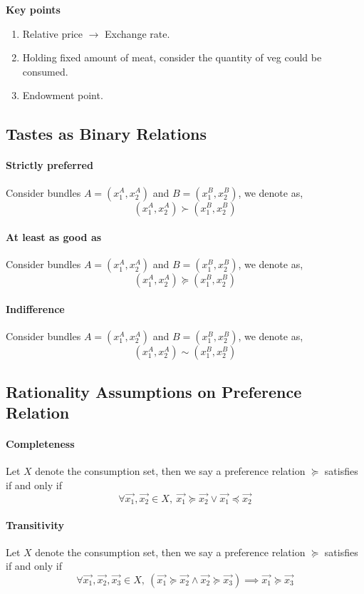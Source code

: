 \documentclass{article}
\begin{document}
\textbf{Key points}
\begin{enumerate}
	\item Relative price $\rightarrow$ Exchange rate.
	\item Holding fixed amount of meat, consider the quantity of veg could be consumed.
	\item Endowment point.
\end{enumerate}

\subsection{Tastes as Binary Relations}
\paragraph{Strictly preferred} Consider bundles $A=(x_1^A, x_2^A)$ and $B=(x_1^B, x_2^B)$, we denote  as,
\[
	(x_1^A, x_2^A) \succ (x_1^B, x_2^B)
\]

\paragraph{At least as good as} Consider bundles $A=(x_1^A, x_2^A)$ and $B=(x_1^B, x_2^B)$, we denote  as,
\[
	(x_1^A, x_2^A) \succcurlyeq (x_1^B, x_2^B)
\]
\paragraph{Indifference} Consider bundles $A=(x_1^A, x_2^A)$ and $B=(x_1^B, x_2^B)$, we denote  as,
\[
	(x_1^A, x_2^A) \sim (x_1^B, x_2^B)
\]

\subsection{Rationality Assumptions on Preference Relation}

\paragraph{Completeness} Let $X$ denote the consumption set, then we say a preference relation $\succcurlyeq$ satisfies  if and only if
\[
	\forall \vec{x_1}, \vec{x_2} \in X,\ \vec{x_1} \succcurlyeq \vec{x_2} \lor \vec{x_1} \preccurlyeq \vec{x_2}
\]

\paragraph{Transitivity} Let $X$ denote the consumption set, then we say a preference relation $\succcurlyeq$ satisfies  if and only if
\[
	\forall \vec{x_1}, \vec{x_2}, \vec{x_3} \in X,\ (\vec{x_1} \succcurlyeq \vec{x_2} \land \vec{x_2} \succcurlyeq \vec{x_3}) \implies \vec{x_1} \succcurlyeq \vec{x_3}
\]
\end{document}
